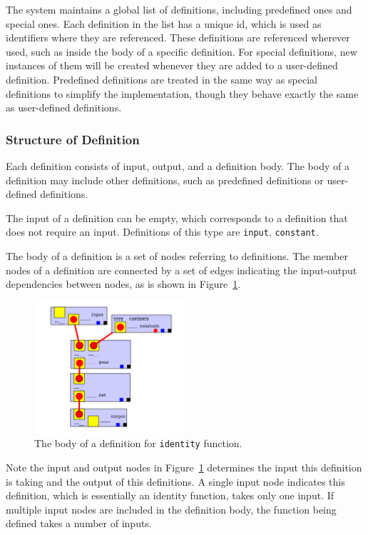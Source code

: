\documentclass[12pt,UTF8,a4]{article}
\newcommand{\code}[1]{\texttt{#1}}
\begin{document}
The system maintains a global list of definitions, including predefined ones and special ones. Each definition in the list has a unique id, which is used as identifiers where they are referenced. These definitions are referenced wherever used, such as inside the body of a specific definition. For special definitions, new instances of them will be created whenever they are added to a user-defined definition. Predefined definitions are treated in the same way as special definitions to simplify the implementation, though they behave exactly the same as user-defined definitions.

\subsubsection{Structure of Definition}
Each definition consists of input, output, and a definition body. The body of a definition may include other definitions, such as predefined definitions or user-defined definitions.

The input of a definition can be empty, which corresponds to a definition that does not require an input. Definitions of this type are \code{input}, \code{constant}.

The body of a definition is a set of nodes referring to definitions. The member nodes of a definition are connected by a set of edges indicating the input-output dependencies between nodes, as is shown in Figure~\ref{fig:defbody}.

\begin{figure}[h]
\center
\includegraphics[width=0.5\textwidth]{./images/defbody}
\caption{The body of a definition for \code{identity} function.}\label{fig:defbody}
\end{figure}

Note the input and output nodes in Figure~\ref{fig:defbody} determines the input this definition is taking and the output of this definitions. A single input node indicates this definition, which is essentially an identity function, takes only one input. If multiple input nodes are included in the definition body, the function being defined takes a number of inputs.
\end{document}
